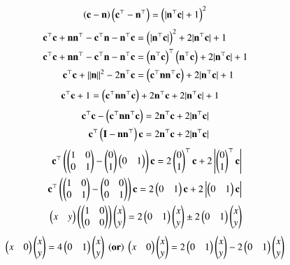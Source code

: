 \documentclass[journal]{IEEEtran}
\begin{document}
\begin{align}
\left(\mathbf{c}-\mathbf{n}\right)\left(\mathbf{c}^\top-\mathbf{n}^\top\right)=\left(|\mathbf{n}^\top\mathbf{c}|+1\right)^2 
\end{align}
\begin{align}
\mathbf{c}^\top\mathbf{c}+\mathbf{n}\mathbf{n}^\top-\mathbf{c}^\top\mathbf{n}-\mathbf{n}^\top\mathbf{c}&= \left(|\mathbf{n}^\top\mathbf{c}|\right)^2+2|\mathbf{n}^\top\mathbf{c}|+1\\
\mathbf{c}^\top\mathbf{c}+\mathbf{n}\mathbf{n}^\top-\mathbf{c}^\top\mathbf{n}-\mathbf{n}^\top\mathbf{c}&=\left(\mathbf{n}^\top\mathbf{c}\right)^\top\left(\mathbf{n}^\top\mathbf{c}\right)+2|\mathbf{n}^\top\mathbf{c}|+1\\
\mathbf{c}^\top\mathbf{c}+\left\lVert\mathbf{n}\right\rVert^2-2\mathbf{n}^\top\mathbf{c}&=\left(\mathbf{c}^\top\mathbf{n}\mathbf{n}^\top\mathbf{c}\right)+2|\mathbf{n}^\top\mathbf{c}|+1 
\end{align}
\begin{align}
\mathbf{c}^\top\mathbf{c}+1&=\left(\mathbf{c}^\top\mathbf{n}\mathbf{n}^\top\mathbf{c}\right)+2\mathbf{n}^\top\mathbf{c}+2|\mathbf{n}^\top\mathbf{c}|+1 
\end{align}
\begin{align}
\mathbf{c}^\top\mathbf{c}-\left(\mathbf{c}^\top\mathbf{n}\mathbf{n}^\top\mathbf{c}\right)=2\mathbf{n}^\top\mathbf{c}+2|\mathbf{n}^\top\mathbf{c}| \\
\mathbf{c}^\top\left(\mathbf{I}-\mathbf{n}\mathbf{n}^\top\right)\mathbf{c}=2\mathbf{n}^\top\mathbf{c}+2|\mathbf{n}^\top\mathbf{c}| 
\end{align}
\begin{align}
\mathbf{c}^\top\left(\begin{pmatrix}1&0\\0&1\end{pmatrix}-\begin{pmatrix}0\\1\end{pmatrix}\begin{pmatrix}0&1\end{pmatrix}\right)\mathbf{c}=2\begin{pmatrix}0\\1\end{pmatrix}^\top\mathbf{c}+2\left|\begin{pmatrix}0\\1\end{pmatrix}^\top\mathbf{c}\right| \\
\mathbf{c}^\top\left(\begin{pmatrix}1&0\\0&1\end{pmatrix}-\begin{pmatrix}0&0\\0&1\end{pmatrix}\right)\mathbf{c}=2\begin{pmatrix}0&1\end{pmatrix}\mathbf{c}+2\left|\begin{pmatrix}0&1\end{pmatrix}\mathbf{c}\right|\\
\begin{pmatrix}x&y\end{pmatrix}\left(\begin{pmatrix}1&0\\0&0\end{pmatrix}\right)\begin{pmatrix}x\\y\end{pmatrix}=2\begin{pmatrix}0&1\end{pmatrix}\begin{pmatrix}x\\y\end{pmatrix}\pm2\begin{pmatrix}0&1\end{pmatrix}\begin{pmatrix}x\\y\end{pmatrix}
\end{align}
\begin{align}
\myvec{x&0}\myvec{x\\y}=4\myvec{0&1}\myvec{x\\y}\ \brak{\textbf{or}}\ \myvec{x&0}\myvec{x\\y}=2\myvec{0&1}\myvec{x\\y}-2\myvec{0&1}\myvec{x\\y}
\end{align}
\end{document}
